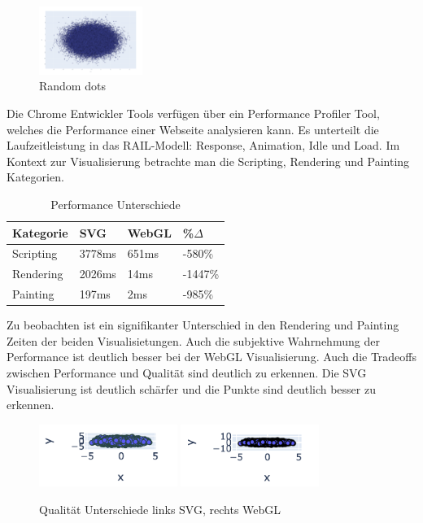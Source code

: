 \documentclass{article}
\begin{document}
\begin{figure}[!h]
\centering
\includegraphics[width=0.3\textwidth]{img/random_dots.png}


\caption{\label{fig: LE1 Random Dots plot}Random dots}
\end{figure}

\noindent
Die Chrome Entwickler Tools verfügen über ein Performance Profiler Tool, welches die Performance einer Webseite analysieren kann. Es unterteilt die Laufzeitleistung in das RAIL-Modell: Response, Animation, Idle und Load.
Im Kontext zur Visualisierung betrachte man die Scripting, Rendering und Painting Kategorien.\cite{kayce_basques_analyze_nodate}

\begin{table}[!h]
\centering
\begin{tabular}{|l|l|l|l|}
\hline
\textbf{Kategorie} & \textbf{SVG} & \textbf{WebGL} & \textbf{\%$\Delta$} \\
\hline
Scripting & 3778ms & 651ms & -580\% \\
\hline
Rendering & 2026ms & 14ms & -1447\% \\
\hline
Painting & 197ms & 2ms & -985\% \\
\hline
\end{tabular}
\caption{\label{tab: LE1 Performance}Performance Unterschiede}
\end{table}

\noindent
Zu beobachten ist ein signifikanter Unterschied in den Rendering und Painting Zeiten der beiden Visualisietungen. Auch die subjektive Wahrnehmung der Performance ist deutlich besser bei der WebGL Visualisierung.
Auch die Tradeoffs zwischen Performance und Qualität sind deutlich zu erkennen. Die SVG Visualisierung ist deutlich schärfer und die Punkte sind deutlich besser zu erkennen.
\begin{figure}[!h]
\centering
\includegraphics[width=0.4\textwidth]{img/svg_quality.png}
\includegraphics[width=0.4\textwidth]{img/webgl_quality.png}
\setlength{\belowcaptionskip}{-10pt}
\caption{\label{fig: LE1 Qualität Unterschiede} Qualität Unterschiede links SVG, rechts WebGL}
\end{figure}
\newpage
\end{document}
